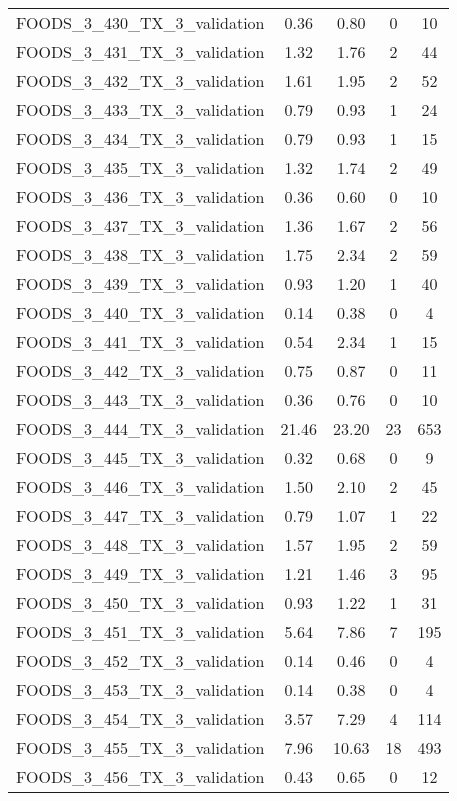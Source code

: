 \begin{table}
\begin{tabular}{|l|c|c|c|c|}
FOODS\_3\_430\_TX\_3\_validation & 0.36 & 0.80 & 0 & 10 \\
FOODS\_3\_431\_TX\_3\_validation & 1.32 & 1.76 & 2 & 44 \\
FOODS\_3\_432\_TX\_3\_validation & 1.61 & 1.95 & 2 & 52 \\
FOODS\_3\_433\_TX\_3\_validation & 0.79 & 0.93 & 1 & 24 \\
FOODS\_3\_434\_TX\_3\_validation & 0.79 & 0.93 & 1 & 15 \\
FOODS\_3\_435\_TX\_3\_validation & 1.32 & 1.74 & 2 & 49 \\
FOODS\_3\_436\_TX\_3\_validation & 0.36 & 0.60 & 0 & 10 \\
FOODS\_3\_437\_TX\_3\_validation & 1.36 & 1.67 & 2 & 56 \\
FOODS\_3\_438\_TX\_3\_validation & 1.75 & 2.34 & 2 & 59 \\
FOODS\_3\_439\_TX\_3\_validation & 0.93 & 1.20 & 1 & 40 \\
FOODS\_3\_440\_TX\_3\_validation & 0.14 & 0.38 & 0 & 4 \\
FOODS\_3\_441\_TX\_3\_validation & 0.54 & 2.34 & 1 & 15 \\
FOODS\_3\_442\_TX\_3\_validation & 0.75 & 0.87 & 0 & 11 \\
FOODS\_3\_443\_TX\_3\_validation & 0.36 & 0.76 & 0 & 10 \\
FOODS\_3\_444\_TX\_3\_validation & 21.46 & 23.20 & 23 & 653 \\
FOODS\_3\_445\_TX\_3\_validation & 0.32 & 0.68 & 0 & 9 \\
FOODS\_3\_446\_TX\_3\_validation & 1.50 & 2.10 & 2 & 45 \\
FOODS\_3\_447\_TX\_3\_validation & 0.79 & 1.07 & 1 & 22 \\
FOODS\_3\_448\_TX\_3\_validation & 1.57 & 1.95 & 2 & 59 \\
FOODS\_3\_449\_TX\_3\_validation & 1.21 & 1.46 & 3 & 95 \\
FOODS\_3\_450\_TX\_3\_validation & 0.93 & 1.22 & 1 & 31 \\
FOODS\_3\_451\_TX\_3\_validation & 5.64 & 7.86 & 7 & 195 \\
FOODS\_3\_452\_TX\_3\_validation & 0.14 & 0.46 & 0 & 4 \\
FOODS\_3\_453\_TX\_3\_validation & 0.14 & 0.38 & 0 & 4 \\
FOODS\_3\_454\_TX\_3\_validation & 3.57 & 7.29 & 4 & 114 \\
FOODS\_3\_455\_TX\_3\_validation & 7.96 & 10.63 & 18 & 493 \\
FOODS\_3\_456\_TX\_3\_validation & 0.43 & 0.65 & 0 & 12 \\

\end{tabular}
\end{table}
